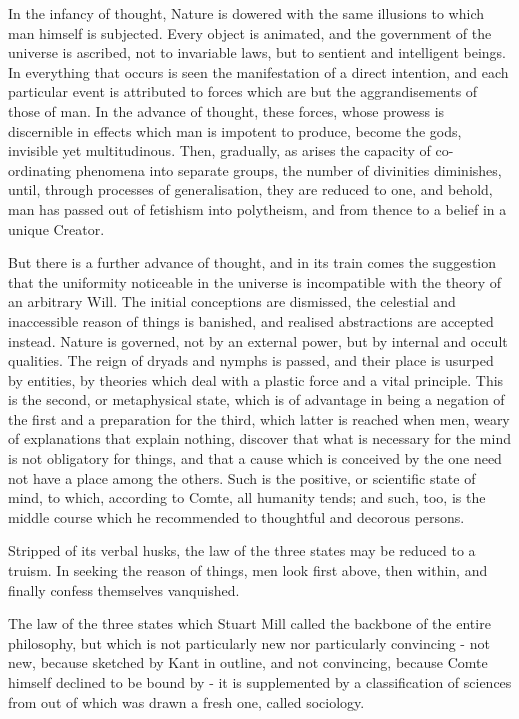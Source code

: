 \documentclass[]{book}
\begin{document}
In the infancy of thought, Nature is dowered with the same illusions to
which man himself is subjected. Every object is animated, and the
government of the universe is ascribed, not to invariable laws, but to
sentient and intelligent beings. In everything that occurs is seen the
manifestation of a direct intention, and each particular event is
attributed to forces which are but the aggrandisements of those of man.
In the advance of thought, these forces, whose prowess is discernible in
effects which man is impotent to produce, become the gods, invisible yet
multitudinous. Then, gradually, as arises the capacity of co-ordinating
phenomena into separate groups, the number of divinities diminishes,
until, through processes of generalisation, they are reduced to one, and
behold, man has passed out of fetishism into polytheism, and from thence
to a belief in a unique Creator.

But there is a further advance of thought, and in its train comes the
suggestion that the uniformity noticeable in the universe is
incompatible with the theory of an arbitrary Will. The initial
conceptions are dismissed, the celestial and inaccessible reason of
things is banished, and realised abstractions are accepted instead.
Nature is governed, not by an external power, but by internal and occult
qualities. The reign of dryads and nymphs is passed, and their place is
usurped by entities, by theories which deal with a plastic force and a
vital principle. This is the second, or metaphysical state, which is of
advantage in being a negation of the first and a preparation for the
third, which latter is reached when men, weary of explanations that
explain nothing, discover that what is necessary for the mind is not
obligatory for things, and that a cause which is conceived by the one
need not have a place among the others. Such is the positive, or
scientific state of mind, to which, according to Comte, all humanity
tends; and such, too, is the middle course which he recommended to
thoughtful and decorous persons.

Stripped of its verbal husks, the law of the three states may be reduced
to a truism. In seeking the reason of things, men look first above, then
within, and finally confess themselves vanquished.

The law of the three states which Stuart Mill called the backbone of the
entire philosophy, but which is not particularly new nor particularly
convincing - not new, because sketched by Kant in outline, and not
convincing, because Comte himself declined to be bound by - it is
supplemented by a classification of sciences from out of which was drawn
a fresh one, called sociology.
\end{document}
